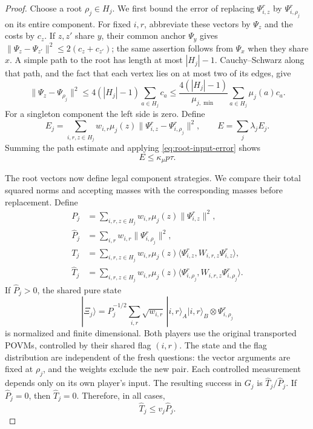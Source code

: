\begin{proof}
Choose a root $\rho_j\in H_j$. We first bound the error of replacing
$\Psi_{i,z}^r$ by $\Psi_{i,\rho_j}^r$ on its entire component. For
fixed $i,r$, abbreviate these vectors by $\Psi_z$ and the costs by
$c_z$. If $z,z'$ share $y$, their common anchor $\Psi_y$ gives
$\|\Psi_z-\Psi_{z'}\|^2\le2(c_z+c_{z'})$; the same assertion follows
from $\Psi_x$ when they share $x$. A simple path to the root has length
at most $|H_j|-1$. Cauchy--Schwarz along that path, and the fact that
each vertex lies on at most two of its edges, give
\[
 \|\Psi_z-\Psi_{\rho_j}\|^2
 \le4(|H_j|-1)\sum_{a\in H_j}c_a
 \le\frac{4(|H_j|-1)}{\mu_{j,\min}}
                         \sum_{a\in H_j}\mu_j(a)c_a.
\]
For a singleton component the left side is zero. Define
\[
 E_j=\sum_{i,r,z\in H_j}w_{i,r}\mu_j(z)
             \|\Psi_{i,z}^r-\Psi_{i,\rho_j}^r\|^2,\qquad
 E=\sum_j\lambda_jE_j.
\]
Summing the path estimate and applying \eqref{eq:root-input-error}
shows
\begin{equation}\label{eq:root-path-error}
 E\le\kappa_\mu p\tau.
\end{equation}

The root vectors now define legal component strategies. We compare their
total squared norms and accepting masses with the corresponding masses
before replacement. Define
\begin{align*}
 P_j&=\sum_{i,r,z\in H_j}w_{i,r}\mu_j(z)\|\Psi_{i,z}^r\|^2,\\
 \widehat P_j&=\sum_{i,r}w_{i,r}\|\Psi_{i,\rho_j}^r\|^2,\\
 T_j&=\sum_{i,r,z\in H_j}w_{i,r}\mu_j(z)
       \langle\Psi_{i,z}^r,W_{i,r,z}\Psi_{i,z}^r\rangle,\\
 \widehat T_j&=\sum_{i,r,z\in H_j}w_{i,r}\mu_j(z)
       \langle\Psi_{i,\rho_j}^r,W_{i,r,z}\Psi_{i,\rho_j}^r\rangle.
\end{align*}
If $\widehat P_j>0$, the shared pure state
\[
 |\Xi_j\rangle=\widehat P_j^{-1/2}
       \sum_{i,r}\sqrt{w_{i,r}}\,
       |i,r\rangle_A|i,r\rangle_B\otimes\Psi_{i,\rho_j}^r
\]
is normalized and finite dimensional. Both players use the original
transported POVMs, controlled by their shared flag $(i,r)$.
The state and the flag distribution are independent of the fresh
questions: the vector arguments are fixed at $\rho_j$, and the weights
exclude the new pair. Each controlled measurement depends only on its
own player's input. The resulting success in $G_j$ is
$\widehat T_j/\widehat P_j$. If $\widehat P_j=0$, then
$\widehat T_j=0$. Therefore, in all cases,
\begin{equation}\label{eq:root-legal-strategy}
 \widehat T_j\le v_j\widehat P_j.
\end{equation}


\end{proof}

